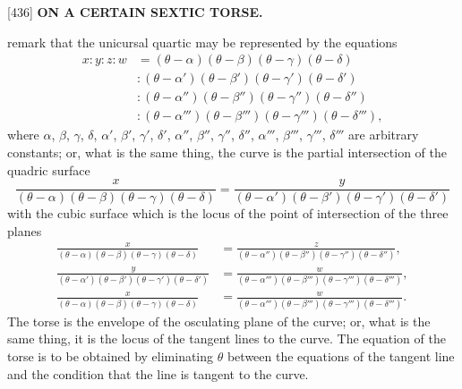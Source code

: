 \documentclass[12pt,a4paper]{article}
\newcommand{\paperref}[1]{\textup{[#1]}}
\theoremstyle{definition}
\begin{document}
\newpage
\setcounter{page}{100}

\noindent\paperref{436}\quad
\textbf{ON A CERTAIN SEXTIC TORSE.}

remark that the unicursal quartic may be represented by the equations
\begin{align*}
x : y : z : w &= (\theta - \alpha)(\theta - \beta)(\theta - \gamma)(\theta - \delta) \\
& : (\theta - \alpha')(\theta - \beta')(\theta - \gamma')(\theta - \delta') \\
& : (\theta - \alpha'')(\theta - \beta'')(\theta - \gamma'')(\theta - \delta'') \\
& : (\theta - \alpha''')(\theta - \beta''')(\theta - \gamma''')(\theta - \delta'''),
\end{align*}
where $\alpha$, $\beta$, $\gamma$, $\delta$, $\alpha'$, $\beta'$, $\gamma'$, $\delta'$, $\alpha''$, $\beta''$, $\gamma''$, $\delta''$, $\alpha'''$, $\beta'''$, $\gamma'''$, $\delta'''$ are arbitrary constants; or, what is the same thing, the curve is the partial intersection of the quadric surface
\[
\frac{x}{(\theta - \alpha)(\theta - \beta)(\theta - \gamma)(\theta - \delta)}
= \frac{y}{(\theta - \alpha')(\theta - \beta')(\theta - \gamma')(\theta - \delta')}
\]
with the cubic surface which is the locus of the point of intersection of the three planes
\begin{align*}
\frac{x}{(\theta - \alpha)(\theta - \beta)(\theta - \gamma)(\theta - \delta)} &=
\frac{z}{(\theta - \alpha'')(\theta - \beta'')(\theta - \gamma'')(\theta - \delta'')},\\
\frac{y}{(\theta - \alpha')(\theta - \beta')(\theta - \gamma')(\theta - \delta')} &=
\frac{w}{(\theta - \alpha''')(\theta - \beta''')(\theta - \gamma''')(\theta - \delta''')},\\
\frac{x}{(\theta - \alpha)(\theta - \beta)(\theta - \gamma)(\theta - \delta)} &=
\frac{w}{(\theta - \alpha''')(\theta - \beta''')(\theta - \gamma''')(\theta - \delta''')}.
\end{align*}
The torse is the envelope of the osculating plane of the curve; or, what is the same thing, it is the locus of the tangent lines to the curve. The equation of the torse is to be obtained by eliminating $\theta$ between the equations of the tangent line and the condition that the line is tangent to the curve.
\end{document}
